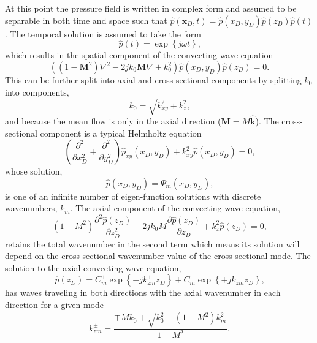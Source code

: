 At this point the pressure field is written in complex form and assumed to be separable in both time and space such that $\hat{p}(\mathbf{x}_D,t) = \hat{p}(x_D,y_D)\hat{p}(z_D)\hat{p}(t)$.
The temporal solution is assumed to take the form
\begin{equation}
  \hat{p}(t) = \exp\left\{j\omega t\right\} \textrm{,}
  \label{eqn:02_pressure_solution_time}
\end{equation}
which results in the spatial component of the convecting wave equation
\begin{equation}
  \left((1-\mathbf{M}^2)\nabla^2-2jk_0\mathbf{M}\nabla+k_0^2\right)\hat{p}(x_D,y_D)\hat{p}(z_D) = 0 \textrm{.}
  \label{eqn:02_wave_conv_space}
\end{equation}
This can be further split into axial and cross-sectional components by splitting $k_0$ into components,
\begin{equation}
  k_0 = \sqrt{k_{xy}^2+k_z^2} \textrm{,}
  \label{eqn:02_k0}
\end{equation}
and because the mean flow is only in the axial direction ($\mathbf{M} = M\mathbf{\hat{k}}$).
The cross-sectional component is a typical Helmholtz equation
\begin{equation}
  \left(\frac{\partial^2}{\partial x_D^2}+\frac{\partial^2}{\partial y_D^2}\right)\hat{p}_{xy}(x_D,y_D)+k_{xy}^2\hat{p}(x_D,y_D) = 0 \textrm{,}
  \label{eqn:02_wave_xy}
\end{equation}
whose solution,
\begin{equation}
  \hat{p}(x_D,y_D) = \Psi_m(x_D,y_D) \textrm{,}
  \label{eqn:02_pressure_solution_xy}
\end{equation}
is one of an infinite number of eigen-function solutions with discrete wavenumbers, $k_m$.
The axial component of the convecting wave equation,
\begin{equation}
  (1-M^2)\frac{\partial^2\hat{p}(z_D)}{\partial z_D^2} - 2jk_0M\frac{\partial\hat{p}(z_D)}{\partial z_D} + k_z^2\hat{p}(z_D) = 0 \textrm{,}
  \label{eqn:02_wave_z}
\end{equation}
retains the total wavenumber in the second term which means its solution will depend on the cross-sectional wavenumber value of the cross-sectional mode.
The solution to the axial convecting wave equation,
\begin{equation}
  \hat{p}(z_D) = C^+_m\exp{\left\{-jk^+_{zm}z_D\right\}}+C^-_m\exp{\left\{+jk^-_{zm}z_D\right\}} \textrm{,}
  \label{eqn:02_pressure_solution_z}
\end{equation}
has waves traveling in both directions with the axial wavenumber in each direction for a given mode
\begin{equation}
  k^\pm_{zm} = \frac{\mp Mk_0+\sqrt{k_0^2-(1-M^2)k_m^2}}{1-M^2} \textrm{.}
  \label{eqn:02_kzm}
\end{equation}

